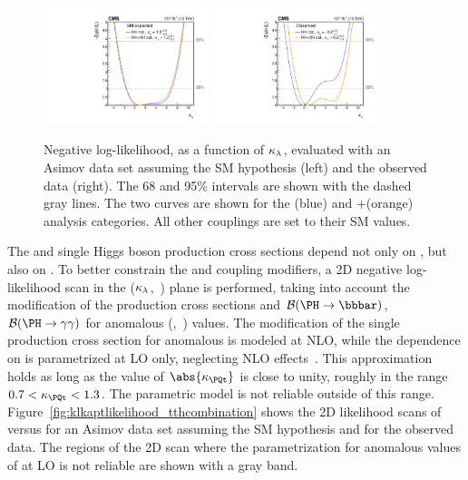\documentclass[11pt,twoside,a4paper,cmspaper,final,collab]{cms-tdr}
\begin{document}
\begin{figure}[!htb]
  \centering
\includegraphics[width=0.43\textwidth]{Figure_011-a.pdf} 
\includegraphics[width=0.43\textwidth]{Figure_011-b.pdf} 
  \caption{Negative log-likelihood, as a function of $\kappa_{\lambda}$, evaluated with an Asimov data set assuming the SM hypothesis (left) and the observed data (right).
 The 68 and 95\% \CL intervals are shown with the dashed gray lines.
 The two curves are shown for the \HH (blue) and \HH+\ttH (orange) analysis categories. All other couplings are set to their SM values.}
\label{fig:kllikelihood}
\end{figure}

The \HH and single Higgs boson production cross sections depend not only on \kapl, but also on \kapt. To better constrain the \kapl and \kapt coupling modifiers, a 2D negative log-likelihood scan in the ($\kappa_{\lambda}$,~\kapt) plane is performed, taking into account the modification of the production cross sections and $\mathcal{B}(\Hbb)$, $\mathcal{B}(\Hgg)$ for anomalous (\kapl,~\kapt) values. The modification of the single \PH production cross section for anomalous \kapl is modeled at NLO, while the dependence on \kapt is parametrized at LO only, neglecting NLO effects~\cite{Maltoni:2017ims}. This approximation holds as long as the value of $\abs{\kapt}$ is close to unity, roughly in the range $ 0.7<\kapt<1.3 $. The parametric model is not reliable outside of this range. 
Figure~\ref{fig:klkaptlikelihood_tthcombination} shows the 2D likelihood scans of \kapl versus \kapt for an Asimov data set assuming the SM hypothesis and for the observed data.
 The regions of the 2D scan where the \kapt parametrization for anomalous values of \kapl at LO is not reliable are shown with a gray band.
\end{document}
